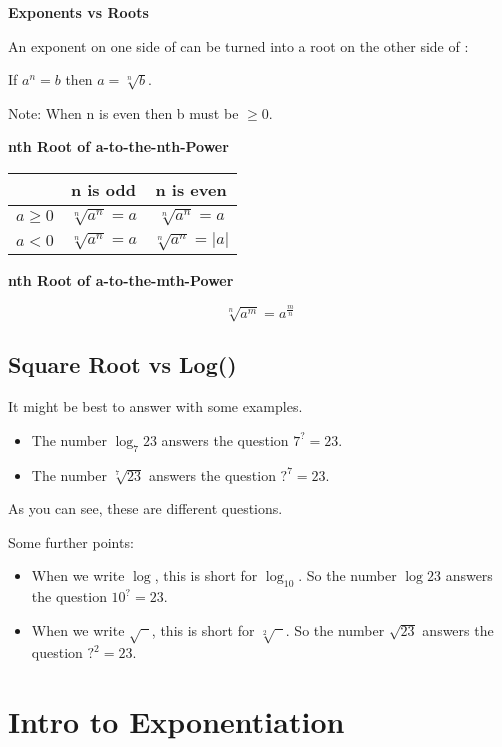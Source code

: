 \textbf{Exponents vs Roots}

An exponent on one side of \q{=} can be turned into a root on the other side of \q{=}:

If \(a^{n}=b\) then \(a=\sqrt[n]{b}\).

Note: When n is even then b must be \(\geq 0\).

\textbf{nth Root of a-to-the-nth-Power}

\begin{tabular}{|c|c|c|}
  \hline
  & n is odd & n is even \\ \hline
  $a \geq 0$ & $\sqrt[n]{a^{n}}=a$ & $\sqrt[n]{a^{n}}=a$ \\ \hline
  $a<0$ & $\sqrt[n]{a^{n}}=a$ & $\sqrt[n]{a^{n}}=|a|$ \\ \hline
\end{tabular}

\vspace{10 mm}

\textbf{nth Root of a-to-the-mth-Power}

\[\sqrt[n]{a^{m}}=a^{\frac{m}{n}}\]

\subsection{Square Root vs Log()}

It might be best to answer with some examples.

\begin{itemize}
  \item The number $\log_7 23$ answers the question $7^{?} = 23$.
  \item The number $\sqrt[7]{23}$ answers the question $?^7 = 23$.
\end{itemize}

As you can see, these are different questions.

Some further points:

\begin{itemize}
  \item When we write $\log$, this is short for $\log_{10}$. So the number $\log 23$ answers the question $10^? = 23$.
  \item When we write $\sqrt{\phantom{x}}$, this is short for $\sqrt[2]{\phantom{x}}$. So the number $\sqrt{23}$ answers the question $?^2 = 23$.
\end{itemize}

\section{Intro to Exponentiation}

